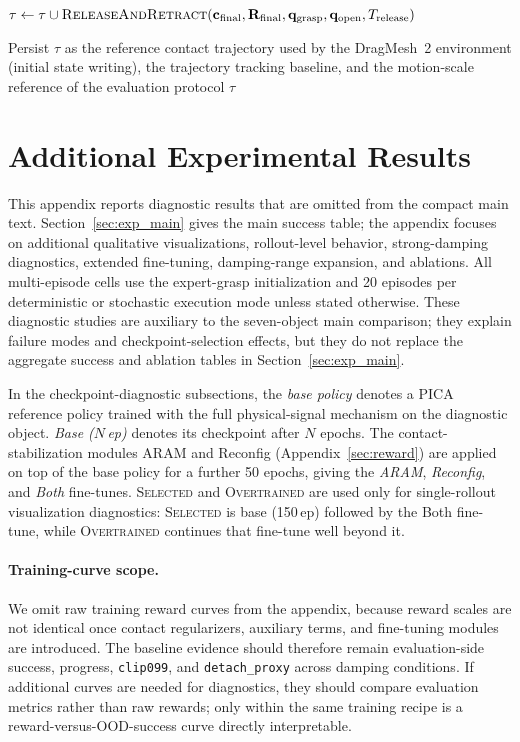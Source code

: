 \begin{algorithm}[t]
\BlankLine
{}
$\tau \leftarrow \tau \cup
   \textsc{ReleaseAndRetract}(
   \mathbf{c}_{\mathrm{final}},\mathbf{R}_{\mathrm{final}},
   \mathbf{q}_{\mathrm{grasp}},\mathbf{q}_{\mathrm{open}},
   T_{\mathrm{release}})$\;

\BlankLine
Persist $\tau$ as the reference contact trajectory used by the
DragMesh~2 environment (initial state writing), the trajectory
tracking baseline, and the motion-scale reference of the evaluation
protocol\;
\Return $\tau$\;
\end{algorithm}

\section{Additional Experimental Results}
\label{sec:exp}

This appendix reports diagnostic results that are omitted from the
compact main text. Section~\ref{sec:exp_main} gives the main success
table; the appendix focuses on additional qualitative visualizations,
rollout-level behavior, strong-damping diagnostics, extended
fine-tuning, damping-range expansion, and ablations.
All multi-episode cells use the expert-grasp initialization and 20
episodes per deterministic or stochastic execution mode unless stated
otherwise. These diagnostic studies are auxiliary to the seven-object
main comparison; they explain failure modes and checkpoint-selection
effects, but they do not replace the aggregate success and ablation
tables in Section~\ref{sec:exp_main}.

In the checkpoint-diagnostic subsections, the \emph{base policy}
denotes a PICA reference policy trained with the full physical-signal
mechanism on the diagnostic object. \emph{Base ($N$\,ep)} denotes its
checkpoint after $N$ epochs. The contact-stabilization modules ARAM
and Reconfig (Appendix~\ref{sec:reward}) are applied on top of the
base policy for a further 50 epochs, giving the \emph{ARAM},
\emph{Reconfig}, and \emph{Both} fine-tunes. \textsc{Selected} and
\textsc{Overtrained} are used only for single-rollout visualization
diagnostics: \textsc{Selected} is base (150\,ep) followed by the Both
fine-tune, while \textsc{Overtrained} continues that fine-tune well
beyond it.

\paragraph{Training-curve scope.}
We omit raw training reward curves from the appendix, because reward
scales are not identical once contact regularizers, auxiliary terms,
and fine-tuning modules are introduced. The baseline evidence should
therefore remain evaluation-side success, progress, \texttt{clip099},
and \texttt{detach\_proxy} across damping conditions. If additional
curves are needed for diagnostics, they should compare evaluation
metrics rather than raw rewards; only within the same training recipe
is a reward-versus-OOD-success curve directly interpretable.

